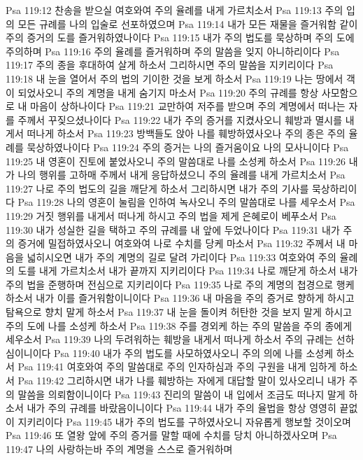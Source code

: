 Psa 119:12  찬송을 받으실 여호와여 주의 율례를 내게 가르치소서
Psa 119:13  주의 입의 모든 규례를 나의 입술로 선포하였으며
Psa 119:14  내가 모든 재물을 즐거워함 같이 주의 증거의 도를 즐거워하였나이다
Psa 119:15  내가 주의 법도를 묵상하며 주의 도에 주의하며
Psa 119:16  주의 율례를 즐거워하며 주의 말씀을 잊지 아니하리이다
Psa 119:17  주의 종을 후대하여 살게 하소서 그리하시면 주의 말씀을 지키리이다
Psa 119:18  내 눈을 열어서 주의 법의 기이한 것을 보게 하소서
Psa 119:19  나는 땅에서 객이 되었사오니 주의 계명을 내게 숨기지 마소서
Psa 119:20  주의 규례를 항상 사모함으로 내 마음이 상하나이다
Psa 119:21  교만하여 저주를 받으며 주의 계명에서 떠나는 자를 주께서 꾸짖으셨나이다
Psa 119:22  내가 주의 증거를 지켰사오니 훼방과 멸시를 내게서 떠나게 하소서
Psa 119:23  방백들도 앉아 나를 훼방하였사오나 주의 종은 주의 율례를 묵상하였나이다
Psa 119:24  주의 증거는 나의 즐거움이요 나의 모사니이다
Psa 119:25  내 영혼이 진토에 붙었사오니 주의 말씀대로 나를 소성케 하소서
Psa 119:26  내가 나의 행위를 고하매 주께서 내게 응답하셨으니 주의 율례를 내게 가르치소서
Psa 119:27  나로 주의 법도의 길을 깨닫게 하소서 그리하시면 내가 주의 기사를 묵상하리이다
Psa 119:28  나의 영혼이 눌림을 인하여 녹사오니 주의 말씀대로 나를 세우소서
Psa 119:29  거짓 행위를 내게서 떠나게 하시고 주의 법을 제게 은혜로이 베푸소서
Psa 119:30  내가 성실한 길을 택하고 주의 규례를 내 앞에 두었나이다
Psa 119:31  내가 주의 증거에 밀접하였사오니 여호와여 나로 수치를 당케 마소서
Psa 119:32  주께서 내 마음을 넓히시오면 내가 주의 계명의 길로 달려 가리이다
Psa 119:33  여호와여 주의 율례의 도를 내게 가르치소서 내가 끝까지 지키리이다
Psa 119:34  나로 깨닫게 하소서 내가 주의 법을 준행하며 전심으로 지키리이다
Psa 119:35  나로 주의 계명의 첩경으로 행케 하소서 내가 이를 즐거워함이니이다
Psa 119:36  내 마음을 주의 증거로 향하게 하시고 탐욕으로 향치 말게 하소서
Psa 119:37  내 눈을 돌이켜 허탄한 것을 보지 말게 하시고 주의 도에 나를 소성케 하소서
Psa 119:38  주를 경외케 하는 주의 말씀을 주의 종에게 세우소서
Psa 119:39  나의 두려워하는 훼방을 내게서 떠나게 하소서 주의 규례는 선하심이니이다
Psa 119:40  내가 주의 법도를 사모하였사오니 주의 의에 나를 소성케 하소서
Psa 119:41  여호와여 주의 말씀대로 주의 인자하심과 주의 구원을 내게 임하게 하소서
Psa 119:42  그리하시면 내가 나를 훼방하는 자에게 대답할 말이 있사오리니 내가 주의 말씀을 의뢰함이니이다
Psa 119:43  진리의 말씀이 내 입에서 조금도 떠나지 말게 하소서 내가 주의 규례를 바랐음이니이다
Psa 119:44  내가 주의 율법을 항상 영영히 끝없이 지키리이다
Psa 119:45  내가 주의 법도를 구하였사오니 자유롭게 행보할 것이오며
Psa 119:46  또 열왕 앞에 주의 증거를 말할 때에 수치를 당치 아니하겠사오며
Psa 119:47  나의 사랑하는바 주의 계명을 스스로 즐거워하며
